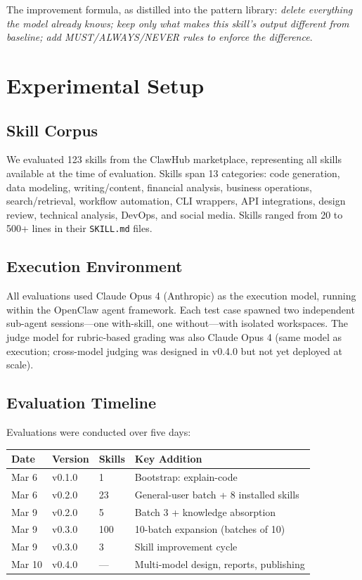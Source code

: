 \documentclass[11pt,a4paper]{article}
\begin{document}
The improvement formula, as distilled into the pattern library: \emph{delete everything the model already knows; keep only what makes this skill's output different from baseline; add MUST/ALWAYS/NEVER rules to enforce the difference}.

\section{Experimental Setup}
\label{sec:setup}

\subsection{Skill Corpus}

We evaluated 123 skills from the ClawHub marketplace, representing all skills available at the time of evaluation. Skills span 13 categories: code generation, data modeling, writing/content, financial analysis, business operations, search/retrieval, workflow automation, CLI wrappers, API integrations, design review, technical analysis, DevOps, and social media. Skills ranged from 20 to 500+ lines in their \texttt{SKILL.md} files.

\subsection{Execution Environment}

All evaluations used Claude Opus 4 (Anthropic) as the execution model, running within the OpenClaw agent framework. Each test case spawned two independent sub-agent sessions---one with-skill, one without---with isolated workspaces. The judge model for rubric-based grading was also Claude Opus 4 (same model as execution; cross-model judging was designed in v0.4.0 but not yet deployed at scale).

\subsection{Evaluation Timeline}

Evaluations were conducted over five days:

\begin{center}
\begin{tabular}{llll}
\toprule
\textbf{Date} & \textbf{Version} & \textbf{Skills} & \textbf{Key Addition} \\
\midrule
Mar 6 & v0.1.0 & 1 & Bootstrap: explain-code \\
Mar 6 & v0.2.0 & 23 & General-user batch + 8 installed skills \\
Mar 9 & v0.2.0 & 5 & Batch 3 + knowledge absorption \\
Mar 9 & v0.3.0 & 100 & 10-batch expansion (batches of 10) \\
Mar 9 & v0.3.0 & 3 & Skill improvement cycle \\
Mar 10 & v0.4.0 & --- & Multi-model design, reports, publishing \\
\bottomrule
\end{tabular}
\end{center}
\end{document}
